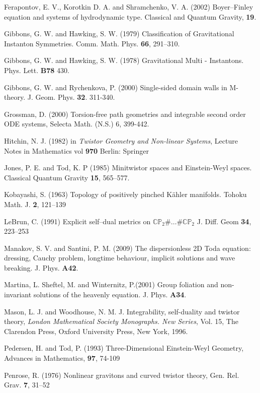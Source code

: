\begin{thebibliography}{}
  Ferapontov, E.  V., Korotkin D. A.  and Shramchenko, V. A. (2002)
Boyer–Finley equation and systems of hydrodynamic type.
Classical and Quantum Gravity, {\bf 19}.

 Gibbons, G. W. and Hawking, S. W. (1979) Classification of Gravitational Instanton Symmetries.
Comm. Math. Phys. {\bf 66}, 291--310.

Gibbons, G. W. and Hawking, S. W. (1978)
Gravitational Multi - Instantons.
Phys. Lett. \textbf{B78}
430.

Gibbons, G. W. and Rychenkova, P. (2000)
Single-sided domain walls in M-theory.
J. Geom. Phys. \textbf{32}. 311-340.

 Grossman, D. (2000) Torsion-free path geometries and integrable second order ODE systems, Selecta
Math. (N.S.) 6, 399-442.

 Hitchin, N. J. (1982) in {\em Twistor Geometry and Non-linear Systems}, Lecture Notes in Mathematics vol {\bf 970} Berlin: Springer

Jones, P. E. and  Tod, K. P (1985)
Minitwistor spaces and Einstein-Weyl spaces. 
Classical Quantum Gravity {\bf 15}, 565--577.

Kobayashi, S. (1963)
Topology of positively pinched K\"ahler manifolds.
Tohoku Math. J. {\bf 2}, 121--139

 LeBrun, C. (1991)
Explicit self--dual metrics on $\mathbb{CP}_2\#\dots \#\mathbb{CP}_2$
J. Diff. Geom {\bf 34}, 223--253

 Manakov, S. V. and Santini, P. M. (2009)
The dispersionless 2D Toda equation: dressing, Cauchy problem, longtime behaviour, implicit solutions and wave breaking. J. Phys. {\bf A42}.

Martina, L. Sheftel, M. and Winternitz, P.(2001)
Group foliation and non-invariant
solutions of the heavenly equation.
J. Phys. {\bf A34}.

 Mason, L. J. and Woodhouse, N. M. J.  Integrability, self-duality and twistor theory, {\em London Mathematical Society Monographs. New Series}, Vol. 15, The Clarendon Press, Oxford University Press, New York, 1996.


 Pedersen, H. and Tod, P. (1993)
Three-Dimensional Einstein-Weyl Geometry,
Advances in Mathematics, {\bf 97}, 74-109


 Penrose, R. (1976) Nonlinear 
gravitons and curved twistor theory, Gen. Rel. Grav.  {\bf 7},  31--52


\end{thebibliography}

